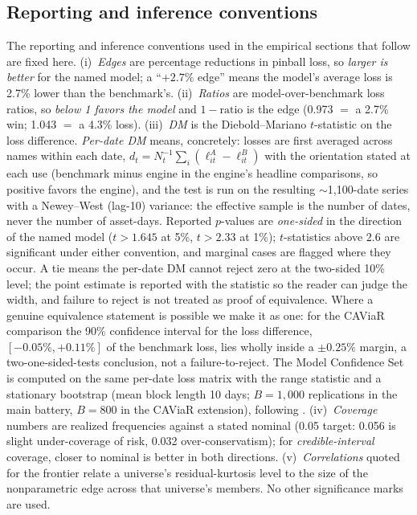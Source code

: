 \documentclass[11pt]{article}
\theoremstyle{remark}
\begin{document}
\subsection{Reporting and inference conventions}
The reporting and inference conventions used in the empirical sections that follow are fixed here. (i)~\emph{Edges} are percentage
reductions in pinball loss, so \emph{larger is better} for the named
model; a ``$+2.7\%$ edge'' means the model's average loss is 2.7\%
lower than the benchmark's. (ii)~\emph{Ratios} are model-over-benchmark
loss ratios, so \emph{below 1 favors the model} and $1-\text{ratio}$ is
the edge (0.973 $=$ a 2.7\% win; 1.043 $=$ a 4.3\% loss).
(iii)~\emph{DM} is the Diebold--Mariano $t$-statistic on the loss
difference. \emph{Per-date DM} means, concretely: losses are first
averaged across names within each date,
$d_t = N_t^{-1}\sum_i (\ell^{A}_{it} - \ell^{B}_{it})$ with the
orientation stated at each use (benchmark minus engine in the engine's
headline comparisons, so positive favors the engine), and the test is
run on the resulting $\sim$1{,}100-date series with a Newey--West
(lag-10) variance: the effective sample is the number of dates, never
the number of asset-days. Reported $p$-values are \emph{one-sided} in
the direction of the named model ($t>1.645$ at 5\%, $t>2.33$ at 1\%);
$t$-statistics above $2.6$ are significant under either convention, and
marginal cases are flagged where they occur. A tie means the
per-date DM cannot reject zero at the two-sided 10\% level; the point
estimate is reported with the statistic so the reader can judge the
width, and failure to reject is not treated as proof of equivalence.
Where a genuine equivalence statement is possible we make it as one: for the CAViaR comparison the 90\% confidence interval for
the loss difference, $[-0.05\%,+0.11\%]$ of the benchmark loss, lies wholly inside a $\pm0.25\%$ margin, a two-one-sided-tests conclusion, not a failure-to-reject. The Model Confidence Set is
computed on the same per-date loss matrix with the range statistic and a
stationary bootstrap (mean block length 10 days; $B=1{,}000$ replications
in the main battery, $B=800$ in the CAViaR extension),
following \citet{hansen2011mcs}. (iv)~\emph{Coverage}
numbers are realized frequencies against a stated nominal (0.05 target:
0.056 is slight under-coverage of risk, 0.032 over-conservatism); for
\emph{credible-interval} coverage, closer to nominal is better in both
directions. (v)~\emph{Correlations} quoted for the frontier relate a universe's
residual-kurtosis level to the size of the nonparametric edge across
that universe's members. No other significance marks are used.
\end{document}
